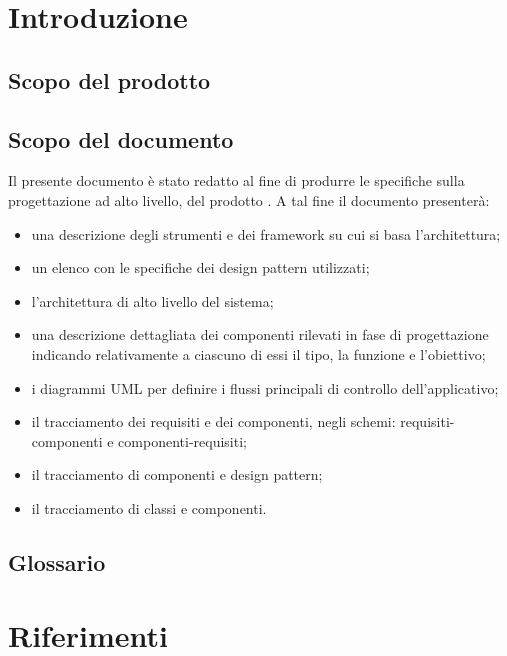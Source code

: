 

\setcounter{page}{1}
\pagestyle{normal}

\newpage

\section{Introduzione}
\subsection{Scopo del prodotto}
\purpose

\subsection{Scopo del documento}
Il presente documento è stato redatto al fine di produrre le specifiche sulla progettazione ad alto livello, del prodotto \caName. A tal fine il documento presenterà:
\begin{itemize}
    \item una descrizione degli strumenti e dei framework su cui si basa l'architettura;
	\item un elenco con le specifiche dei design pattern utilizzati;
	\item l'architettura di alto livello del sistema;
	\item una descrizione dettagliata dei componenti rilevati in fase di progettazione indicando relativamente a ciascuno di essi il tipo, la funzione e l'obiettivo;
	\item i diagrammi UML per definire i flussi principali di controllo dell'applicativo;
	\item il tracciamento dei requisiti e dei componenti, negli schemi: requisiti-componenti e componenti-requisiti;
	\item il tracciamento di componenti e design pattern;
	\item il tracciamento di classi e componenti.
\end{itemize}

\subsection{Glossario}
\glossaryIntro

\clearpage
\section{Riferimenti}

